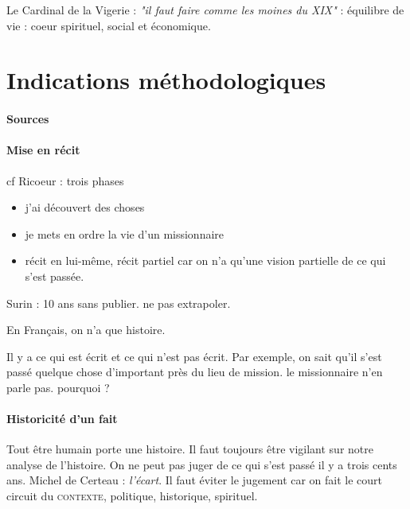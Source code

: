 Le Cardinal de la Vigerie : \textit{"il faut faire comme les moines du XIX" }: équilibre de vie : coeur spirituel, social et économique. 


\section{Indications méthodologiques}

\paragraph{Sources}
\paragraph{Mise en récit} cf Ricoeur : trois phases 
\begin{itemize}
\item j'ai découvert des choses
\item je mets en ordre la vie d'un missionnaire
\item récit en lui-même, récit partiel car on n'a qu'une vision partielle de ce qui s'est passée.
\end{itemize}

\begin{Ex}
Surin : 10 ans sans publier. ne pas extrapoler.
\end{Ex} 

\begin{Def}
En Français, on n'a que histoire.
\end{Def}

Il y a ce qui est écrit et ce qui n'est pas écrit. Par exemple, on sait qu'il s'est passé quelque chose d'important près du lieu de mission. le missionnaire n'en parle pas. pourquoi ?

\paragraph{Historicité d'un fait}
Tout être humain porte une histoire. Il faut toujours être vigilant sur notre analyse de l'histoire. On ne peut pas juger de ce qui s'est passé il y a trois cents ans. Michel de Certeau : \textit{l'écart}. Il faut éviter le jugement car on fait le court circuit du \textsc{contexte}, politique, historique, spirituel.

